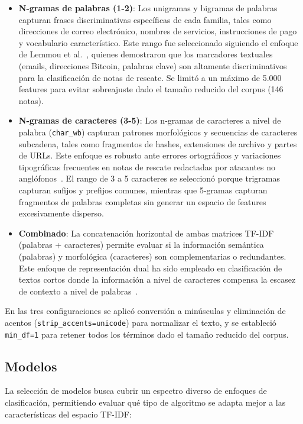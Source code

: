 \begin{itemize}
\item \textbf{N-gramas de palabras (1-2)}: Los unigramas y bigramas de palabras capturan frases discriminativas específicas de cada familia, tales como direcciones de correo electrónico, nombres de servicios, instrucciones de pago y vocabulario característico. Este rango fue seleccionado siguiendo el enfoque de Lemmou et al.~\cite{paper_5_note_files}, quienes demostraron que los marcadores textuales (emails, direcciones Bitcoin, palabras clave) son altamente discriminativos para la clasificación de notas de rescate. Se limitó a un máximo de 5.000 features para evitar sobreajuste dado el tamaño reducido del corpus (146 notas).

\item \textbf{N-gramas de caracteres (3-5)}: Los n-gramas de caracteres a nivel de palabra (\texttt{char\_wb}) capturan patrones morfológicos y secuencias de caracteres subcadena, tales como fragmentos de hashes, extensiones de archivo y partes de URLs. Este enfoque es robusto ante errores ortográficos y variaciones tipográficas frecuentes en notas de rescate redactadas por atacantes no anglófonos~\cite{paper_5_note_files}. El rango de 3 a 5 caracteres se seleccionó porque trigramas capturan sufijos y prefijos comunes, mientras que 5-gramas capturan fragmentos de palabras completas sin generar un espacio de features excesivamente disperso.

\item \textbf{Combinado}: La concatenación horizontal de ambas matrices TF-IDF (palabras + caracteres) permite evaluar si la información semántica (palabras) y morfológica (caracteres) son complementarias o redundantes. Este enfoque de representación dual ha sido empleado en clasificación de textos cortos donde la información a nivel de caracteres compensa la escasez de contexto a nivel de palabras~\cite{joachims1998}.
\end{itemize}

En las tres configuraciones se aplicó conversión a minúsculas y eliminación de acentos (\texttt{strip\_accents=unicode}) para normalizar el texto, y se estableció \texttt{min\_df=1} para retener todos los términos dado el tamaño reducido del corpus.

\subsection{Modelos}

La selección de modelos busca cubrir un espectro diverso de enfoques de clasificación, permitiendo evaluar qué tipo de algoritmo se adapta mejor a las características del espacio TF-IDF:

